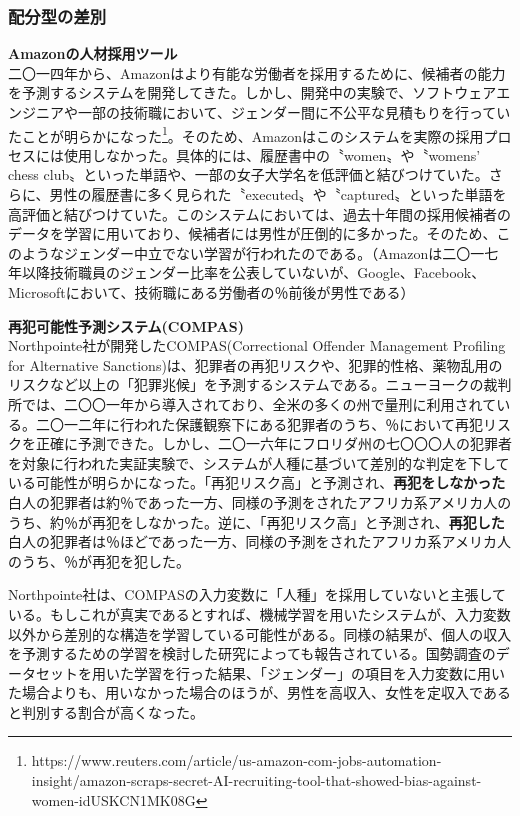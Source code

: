 \documentclass[b5j,twoside,twocolumn]{utarticle}
\begin{document}
\subsubsection*{配分型の差別}
\textbf{Amazonの人材採用ツール}\\
二〇一四年から、Amazonはより有能な労働者を採用するために、候補者の能力を予測するシステムを開発してきた。しかし、開発中の実験で、ソフトウェアエンジニアや一部の技術職において、ジェンダー間に不公平な見積もりを行っていたことが明らかになった\footnote{https://www.reuters.com/article/us-amazon-com-jobs-automation-insight/amazon-scraps-secret-AI-recruiting-tool-that-showed-bias-against-women-idUSKCN1MK08G}。そのため、Amazonはこのシステムを実際の採用プロセスには使用しなかった。具体的には、履歴書中の〝women〟や〝womens' chess club〟といった単語や、一部の女子大学名を低評価と結びつけていた。さらに、男性の履歴書に多く見られた〝executed〟や〝captured〟といった単語を高評価と結びつけていた。このシステムにおいては、過去十年間の採用候補者のデータを学習に用いており、候補者には男性が圧倒的に多かった。そのため、このようなジェンダー中立でない学習が行われたのである。（Amazonは二〇一七年以降技術職員のジェンダー比率を公表していないが、Google、Facebook、Microsoftにおいて、技術職にある労働者の％前後が男性である）


\textbf{再犯可能性予測システム(COMPAS)}\\
Northpointe社が開発したCOMPAS(Correctional Offender Management Profiling for Alternative Sanctions)は、犯罪者の再犯リスクや、犯罪的性格、薬物乱用のリスクなど以上の「犯罪兆候」を予測するシステムである。ニューヨークの裁判所では、二〇〇一年から導入されており、全米の多くの州で量刑に利用されている。二〇一二年に行われた保護観察下にある犯罪者のうち、％において再犯リスクを正確に予測できた。しかし、二〇一六年にフロリダ州の七〇〇〇人の犯罪者を対象に行われた実証実験\cite{compas}で、システムが人種に基づいて差別的な判定を下している可能性が明らかになった。「再犯リスク高」と予測され、\textbf{再犯をしなかった}白人の犯罪者は約％であった一方、同様の予測をされたアフリカ系アメリカ人のうち、約％が再犯をしなかった。逆に、「再犯リスク高」と予測され、\textbf{再犯した}白人の犯罪者は％ほどであった一方、同様の予測をされたアフリカ系アメリカ人のうち、％が再犯を犯した。

Northpointe社は、COMPASの入力変数に「人種」を採用していないと主張している。もしこれが真実であるとすれば、機械学習を用いたシステムが、入力変数以外から差別的な構造を学習している可能性がある。同様の結果が、個人の収入を予測するための学習を検討した研究によっても報告されている。国勢調査のデータセットを用いた学習を行った結果、「ジェンダー」の項目を入力変数に用いた場合よりも、用いなかった場合のほうが、男性を高収入、女性を定収入であると判別する割合が高くなった\cite{Calders2010}。
\end{document}
